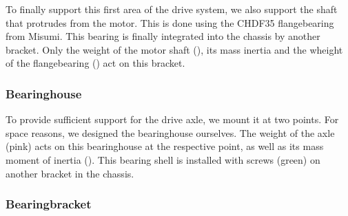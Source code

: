 To finally support this first area of the drive system, we also support the shaft that protrudes from the motor. This is done using the CHDF35 flangebearing from Misumi. This bearing is finally integrated into the chassis by another bracket. Only the weight of the motor shaft (), its mass inertia and the wheight of the flangebearing () act on this bracket.


\subsubsection{Bearinghouse}


To provide sufficient support for the drive axle, we mount it at two points. For space reasons, we designed the bearinghouse ourselves. The weight of the axle (pink) acts on this bearinghouse at the respective point, as well as its mass moment of inertia (). This bearing shell is installed with screws (green) on another bracket in the chassis.



\subsubsection{Bearingbracket}

